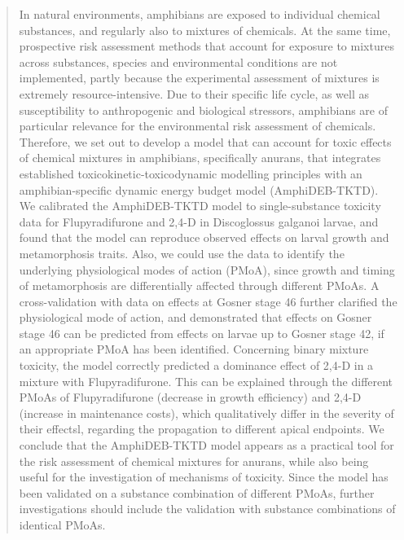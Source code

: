\documentclass[utf8]{FrontiersinHarvard} %
\def\keyFont{\fontsize{8}{11}\helveticabold }
\begin{document}
\begin{abstract}

In natural environments, amphibians are exposed to individual chemical substances, and regularly also to mixtures of chemicals. 
At the same time, prospective risk assessment methods that account for exposure to mixtures across substances, 
species and environmental conditions are not implemented, partly because the experimental assessment of mixtures is extremely resource-intensive. 
Due to their specific life cycle, as well as susceptibility to anthropogenic and biological stressors, 
amphibians are of particular relevance for the environmental risk assessment of chemicals. 
Therefore, we set out to develop a model that can account for toxic effects of chemical mixtures in amphibians, specifically anurans, 
that integrates established toxicokinetic-toxicodynamic modelling principles with an amphibian-specific dynamic energy budget model (AmphiDEB-TKTD). 
We calibrated the AmphiDEB-TKTD model to single-substance toxicity data for Flupyradifurone and 2,4-D in Discoglossus galganoi larvae, 
and found that the model can reproduce observed effects on larval growth and metamorphosis traits. 
Also, we could use the data to identify the underlying physiological modes of action (PMoA), 
since growth and timing of metamorphosis are differentially affected through different PMoAs. 
A cross-validation with data on effects at Gosner stage 46 further clarified the physiological mode of action, 
and demonstrated that effects on Gosner stage 46 can be predicted from effects on larvae up to Gosner stage 42, 
if an appropriate PMoA has been identified. Concerning binary mixture toxicity, 
the model correctly predicted a dominance effect of 2,4-D in a mixture with Flupyradifurone. 
This can be explained through the different PMoAs of Flupyradifurone (decrease in growth efficiency) and 2,4-D (increase in maintenance costs), 
which qualitatively differ in the severity of their effectsl, regarding the propagation to different apical endpoints. 
We conclude that the AmphiDEB-TKTD model appears as a practical tool for the risk assessment of chemical mixtures for anurans, 
while also being useful for the investigation of mechanisms of toxicity. 
Since the model has been validated on a substance combination of different PMoAs, 
further investigations should include the validation with substance combinations of identical PMoAs. 

\tiny
 \keyFont{ \section{Keywords:} } %
\end{abstract}
\end{document}
